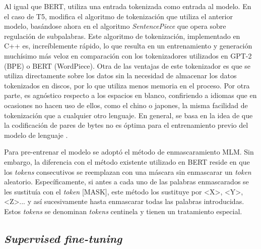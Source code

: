 Al igual que BERT, utiliza una entrada tokenizada como entrada al modelo. En el caso de T5, modifica el algoritmo de tokenización que utiliza el anterior modelo, basándose ahora en el algoritmo \textit{SentencePiece} que opera sobre regulación de subpalabras. Este algoritmo de tokenización, implementado en C++ es, increíblemente rápido, lo que resulta en un entrenamiento y generación muchísimo más veloz en comparación con los tokenizadores utilizados en GPT-2 (BPE) o BERT (WordPiece). Otra de las ventajas de este tokenizador es que se utiliza directamente sobre los datos sin la necesidad de almacenar los datos tokenizados en discos, por lo que utiliza menos memoria en el proceso. Por otra parte, es agnóstico respecto a los espacios en blanco, confiriendo a idiomas que en ocasiones no hacen uso de ellos, como el chino o japones, la misma facilidad de tokenización que a cualquier otro lenguaje. En general, se basa en la idea de que la codificación de pares de bytes no es óptima para el entrenamiento previo del modelo de lenguaje \citep{bostrom-durrett-2020-byte}.

Para pre-entrenar el modelo se adoptó el método de enmascaramiento MLM. Sin embargo, la diferencia con el método existente utilizado en BERT reside en que los \textit{tokens} consecutivos se reemplazan con una máscara sin enmascarar un \textit{token} aleatorio. Específicamente, si antes a cada uno de las palabras enmascarados se les sustituía con el \textit{token} [MASK], este método los sustituye por <X>, <Y>, <Z>... y así sucesivamente hasta enmascarar todas las palabras introducidas. Estos \textit{tokens} se denominan \textit{tokens} centinela y tienen un tratamiento especial.




\subsection{\textit{Supervised fine-tuning}}








